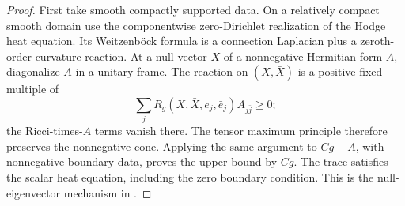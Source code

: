 \documentclass[11pt]{article}
\theoremstyle{definition}
\theoremstyle{remark}
\numberwithin{equation}{section}
\begin{document}
\begin{proof}
First take smooth compactly supported data.  On a relatively compact
smooth domain use the componentwise zero-Dirichlet realization of
the Hodge heat equation.  Its Weitzenb\"ock formula is a connection
Laplacian plus a zeroth-order curvature reaction.  At a null vector
$X$ of a nonnegative Hermitian form $A$, diagonalize $A$ in a unitary
frame.  The reaction on $(X,\bar X)$ is a positive fixed multiple of
\[
 \sum_j R_g(X,\bar X,e_j,\bar e_j)A_{j\bar j}\ge0;
\]
the Ricci-times-$A$ terms vanish there.  The tensor maximum principle
therefore preserves the nonnegative cone.  Applying the same argument
to $Cg-A$, with nonnegative boundary data, proves the upper bound by
$Cg$.  The trace satisfies the scalar heat equation, including the
zero boundary condition.  This is the null-eigenvector mechanism in
\cite[Section~2]{NiTamStructure}.


\end{proof}
\end{document}
